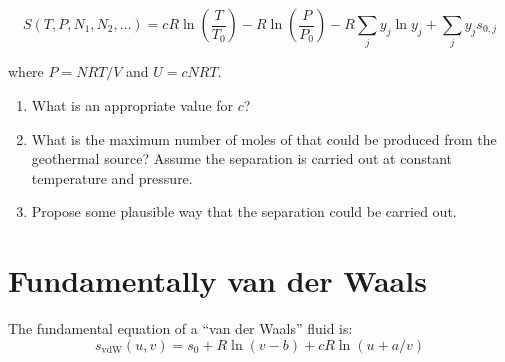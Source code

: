 \documentclass[11pt]{article}
\begin{document}
\begin{equation}
S(T,P,N_{1},N_{2},\ldots) = c R \ln\left ( \frac{T}{T_{0}} \right ) - R \ln\left ( \frac{P}{P_{0}} \right ) - R \sum_{j}y_{j}\ln y_{j} + \sum_{j}y_{j}s_{0,j}
\end{equation}

\noindent where \(P = NRT/V\) and \(U=cNRT\).

\begin{enumerate}
\item What is an appropriate value for \(c\)?

\item What is the maximum number of moles of  that could be produced from the geothermal source?  Assume the separation is carried out at constant temperature and pressure.

\item Propose some plausible way that the separation could be carried out.
\end{enumerate}

\section{Fundamentally van der Waals}
\label{sec:org57e100b}
The fundamental equation of a ``van der Waals'' fluid is:
\begin{equation}
s_\text{vdW}(u,v)=s_{0}+R\ln\left (v-b\right ) +c R \ln \left ( u+a/v \right )
\end{equation}
\end{document}

